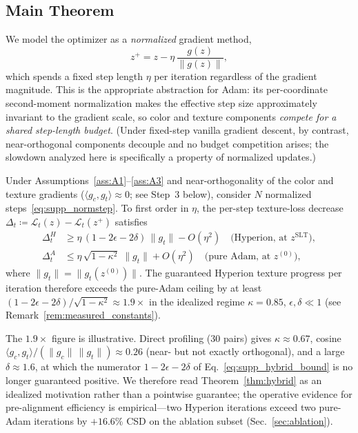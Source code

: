 \subsection{Main Theorem}

We model the optimizer as a \emph{normalized} gradient method,
\begin{equation}
  z^{+} = z - \eta\,\frac{g(z)}{\|g(z)\|},
  \label{eq:supp_normstep}
\end{equation}
which spends a fixed step length $\eta$ per iteration regardless of the
gradient magnitude.
This is the appropriate abstraction for Adam: its per-coordinate second-moment
normalization makes the effective step size approximately invariant to the
gradient scale, so color and texture components \emph{compete for a shared
step-length budget}.
(Under fixed-step vanilla gradient descent, by contrast, near-orthogonal
components decouple and no budget competition arises; the slowdown analyzed
here is specifically a property of normalized updates.)

\begin{theorem}\label{thm:hybrid}
Under Assumptions~\ref{ass:A1}--\ref{ass:A3} and near-orthogonality of the
color and texture gradients ($\langle g_c, g_t\rangle \approx 0$; see
Step~3 below), consider $N$ normalized steps~\eqref{eq:supp_normstep}.
To first order in $\eta$, the per-step texture-loss decrease
$\Delta_t \coloneqq \mathcal{L}_t(z) - \mathcal{L}_t(z^{+})$ satisfies
\begin{align}
  \Delta_t^{H} &\geq \eta\,(1 - 2\epsilon - 2\delta)\,\|g_t\| - O(\eta^2)
  \quad\text{(Hyperion, at } z^\mathrm{SLT}\text{)},
  \label{eq:supp_hybrid_bound}\\[4pt]
  \Delta_t^{A} &\leq \eta\,\sqrt{1-\kappa^2}\;\|g_t\| + O(\eta^2)
  \quad\text{(pure Adam, at } z^{(0)}\text{)},
  \label{eq:supp_adam_bound}
\end{align}
where $\|g_t\| = \|g_t(z^{(0)})\|$.
The guaranteed Hyperion texture progress per iteration therefore exceeds the
pure-Adam ceiling by at least
$(1-2\epsilon-2\delta)/\sqrt{1-\kappa^2} \approx 1.9\times$
in the idealized regime $\kappa = 0.85$, $\epsilon, \delta \ll 1$
(see Remark~\ref{rem:measured_constants}).
\end{theorem}

\begin{remark}\label{rem:measured_constants}
The $1.9\times$ figure is illustrative. Direct profiling ($30$ pairs) gives
$\kappa \approx 0.67$, cosine
$\langle g_c, g_t\rangle/(\|g_c\|\,\|g_t\|) \approx 0.26$ (near- but not
exactly orthogonal), and a large $\delta \approx 1.6$, at which the numerator
$1 - 2\epsilon - 2\delta$ of Eq.~\eqref{eq:supp_hybrid_bound} is no longer
guaranteed positive. We therefore read Theorem~\ref{thm:hybrid} as an idealized
motivation rather than a pointwise guarantee; the operative evidence for
pre-alignment efficiency is empirical---two Hyperion iterations exceed two
pure-Adam iterations by $+16.6\%$ CSD on the ablation subset
(Sec.~\ref{sec:ablation}).
\end{remark}

